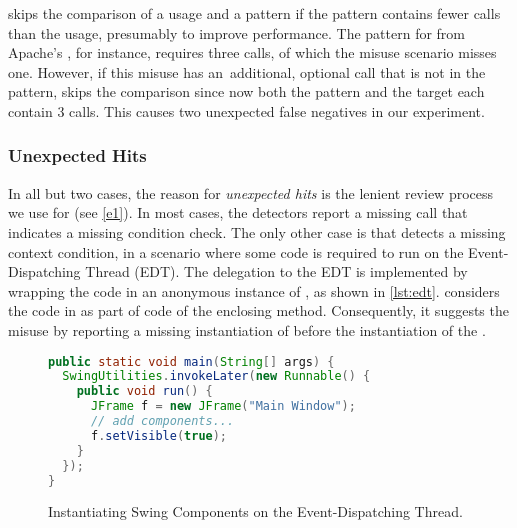 
\vspace{0.03in}
\DMMC skips the comparison of a usage and a pattern if the pattern contains fewer calls than the usage, presumably to improve performance.
The pattern for  from Apache's , for instance, requires three calls, of which the misuse scenario misses one.
However, if this misuse has an~additional, optional call  that is not in the pattern, \DMMC skips the comparison since now both the pattern and the target each contain 3 calls.
This causes two unexpected false negatives in our experiment.

\subsubsection*{Unexpected Hits}

\vspace{0.03in}
In all but two cases, the reason for \emph{unexpected hits} is the lenient review process we use for  (see \autoref{e1}).
In most cases, the detectors report a missing call that indicates a missing condition check.
%
The only other case is that \GROUMiner detects a missing context condition, in a scenario where some  code is required to run on the Event-Dispatching Thread (EDT).
The delegation to the EDT is implemented by wrapping the code in an anonymous instance of , as shown in \autoref{lst:edt}.
\GROUMiner considers the code in  as part of code of the enclosing method.
Consequently, it suggests the misuse by reporting a missing instantiation of  before the instantiation of the .

\begin{figure}[tb]
  \begin{lstlisting}[language=java]
public static void main(String[] args) {
  SwingUtilities.invokeLater(new Runnable() {
    public void run() {
  	  JFrame f = new JFrame("Main Window");
      // add components...
      f.setVisible(true); 
    }
  });
}
  \end{lstlisting}
  \caption{Instantiating Swing Components on the Event-Dispatching Thread.}
  \label{lst:edt}
\end{figure}

